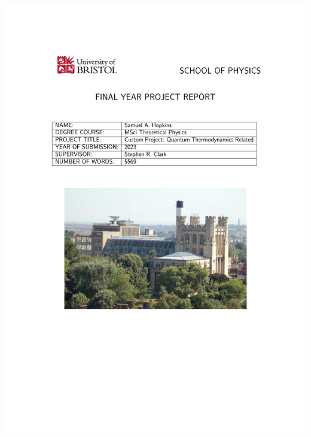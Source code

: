 \documentclass[aps]{revtex4-2}
\begin{document}
\includegraphics[width = \textwidth]{preface.pdf}
\end{document}

